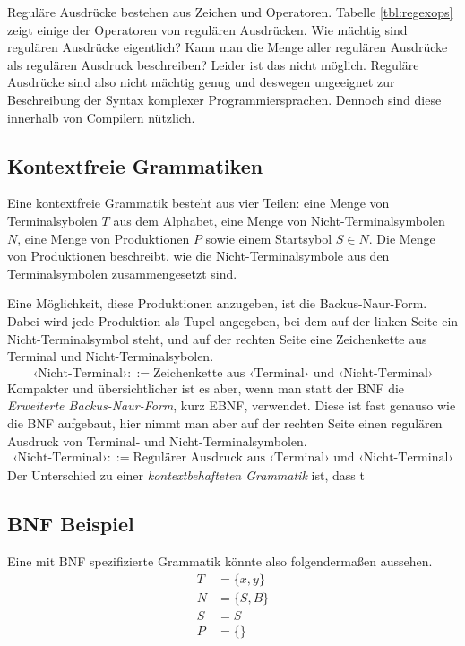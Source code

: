\documentclass[
  ngerman,
  DIV=12
]{scrartcl}
\begin{document}
Reguläre Ausdrücke bestehen aus Zeichen und Operatoren. Tabelle \ref{tbl:regexops} zeigt einige der Operatoren von regulären Ausdrücken. Wie mächtig sind regulären Ausdrücke eigentlich? Kann man die Menge aller regulären Ausdrücke als regulären Ausdruck beschreiben? Leider ist das nicht möglich. Reguläre Ausdrücke sind also nicht mächtig genug und deswegen ungeeignet zur Beschreibung der Syntax komplexer Programmiersprachen. Dennoch sind diese innerhalb von Compilern nützlich.

\subsection{Kontextfreie Grammatiken}

Eine kontextfreie Grammatik besteht aus vier Teilen: eine Menge von Terminalsybolen $T$ aus dem Alphabet, eine Menge von Nicht-Terminalsymbolen $N$, eine Menge von Produktionen $P$ sowie einem Startsybol $S \in N$. Die Menge von Produktionen beschreibt, wie die Nicht-Terminalsymbole aus den Terminalsymbolen zusammengesetzt sind. 

Eine Möglichkeit, diese Produktionen anzugeben, ist die Backus-Naur-Form. Dabei wird jede Produktion als Tupel angegeben, bei dem auf der linken Seite ein Nicht-Terminalsymbol steht, und auf der rechten Seite eine Zeichenkette aus Terminal und Nicht-Terminalsybolen.
\begin{align*}
  ‹\mathrm{Nicht\text{-}Terminal}› ::= \text{Zeichenkette aus } ‹\mathrm{Terminal}› \text{ und } ‹\mathrm{Nicht\text{-}Terminal}›
\end{align*}
Kompakter und übersichtlicher ist es aber, wenn man statt der BNF die \emph{Erweiterte Backus-Naur-Form}, kurz EBNF, verwendet. Diese ist fast genauso wie die BNF aufgebaut, hier nimmt man aber auf der rechten Seite einen regulären Ausdruck von Terminal- und Nicht-Terminalsymbolen.
\begin{align*}
  ‹\mathrm{Nicht\text{-}Terminal}› ::= \text{Regulärer Ausdruck aus } ‹\mathrm{Terminal}› \text{ und } ‹\mathrm{Nicht\text{-}Terminal}›
\end{align*}
Der Unterschied zu einer \emph{kontextbehafteten Grammatik} ist, dass t

\subsection{BNF Beispiel}

Eine mit BNF spezifizierte Grammatik könnte also folgendermaßen aussehen.
\begin{align*}
  T &= \{x, y\}\\
  N &= \{S, B\}\\
  S &= S\\
  P &= \{\}\\  
\end{align*}
\end{document}
